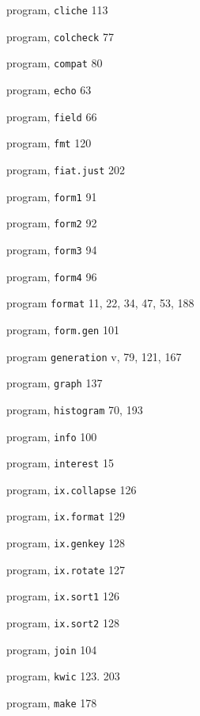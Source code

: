 \begin{multicols}{3}
\hangindent=4pc  program, \verb'cliche' 113

\hangindent=4pc  program, \verb'colcheck' 77

\hangindent=4pc  program, \verb'compat' 80

\hangindent=4pc  program, \verb'echo' 63

\hangindent=4pc  program, \verb'field' 66

\hangindent=4pc  program, \verb'fmt' 120

\hangindent=4pc  program, \verb'fiat.just' 202

\hangindent=4pc  program, \verb'form1' 91

\hangindent=4pc  program, \verb'form2' 92

\hangindent=4pc  program, \verb'form3' 94

\hangindent=4pc  program, \verb'form4' 96

\hangindent=4pc  program \verb'format' 11, 22, 34, 47, 53, 188

\hangindent=4pc  program, \verb'form.gen' 101

\hangindent=4pc  program \verb'generation' v, 79, 121, 167

\hangindent=4pc  program, \verb'graph' 137

\hangindent=4pc  program, \verb'histogram' 70, 193

\hangindent=4pc  program, \verb'info' 100

\hangindent=4pc  program, \verb'interest' 15

\hangindent=4pc  program, \verb'ix.collapse' 126

\hangindent=4pc  program, \verb'ix.format' 129

\hangindent=4pc  program, \verb'ix.genkey' 128

\hangindent=4pc  program, \verb'ix.rotate' 127

\hangindent=4pc  program, \verb'ix.sort1' 126

\hangindent=4pc  program, \verb'ix.sort2' 128

\hangindent=4pc  program, \verb'join' 104

\hangindent=4pc  program, \verb'kwic' 123. 203

\hangindent=4pc  program, \verb'make' 178


\end{multicols}
